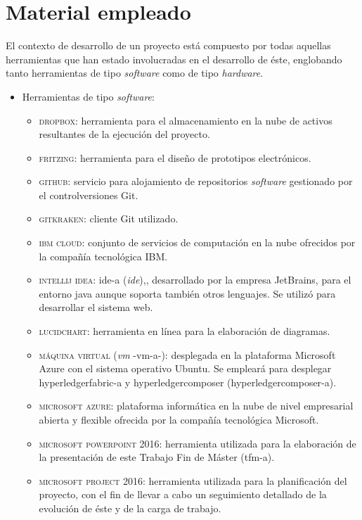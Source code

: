 \documentclass[12pt,a4paper, twoside]{report}
\begin{document}
	\section{Material empleado}\label{tools}
	
	El contexto de desarrollo de un proyecto está compuesto por todas aquellas herramientas que han estado involucradas en el desarrollo de éste, englobando tanto herramientas de tipo \textit{software} como de tipo \textit{hardware}. 

	\begin{itemize}
		\item Herramientas de tipo \textit{software}:
		\begin{itemize}
			\item \textsc{dropbox:} herramienta para el almacenamiento en la nube de activos resultantes de la ejecución del proyecto.
			\item \textsc{fritzing:} herramienta para el diseño de \glspl{prototipo} electrónicos.
			\item \textsc{github:} servicio para alojamiento de repositorios \textit{software} gestionado por el \gls{controlversiones} Git.
			\item \textsc{gitkraken:} cliente Git utilizado.
			\item \textsc{ibm cloud:} conjunto de servicios de computación en la nube ofrecidos por la compañía tecnológica IBM.
			\item \textsc{intellij idea:} \gls{ide-a} (\textit{\gls{ide}}),, desarrollado por la empresa JetBrains, para el entorno \gls{java} aunque soporta también otros lenguajes. Se utilizó para desarrollar el sistema web.
			\item \textsc{lucidchart:} herramienta en línea para la elaboración de diagramas.
			\item \textsc{máquina virtual} (\textit{\gls{vm}} -\gls{vm-a}-): desplegada en la plataforma Microsoft Azure con el sistema operativo Ubuntu. Se empleará para desplegar \gls{hyperledgerfabric-a} y \gls{hyperledgercomposer} (\gls{hyperledgercomposer-a}).
			\item \textsc{microsoft azure:} plataforma informática en la nube de nivel empresarial abierta y flexible ofrecida por la compañía tecnológica Microsoft.
			\item \textsc{microsoft powerpoint 2016:} herramienta utilizada para la elaboración de la presentación de este Trabajo Fin de Máster (\gls{tfm-a}).
			\item \textsc{microsoft project 2016:} herramienta utilizada para la planificación del proyecto, con el fin de llevar a cabo un seguimiento detallado de la evolución de éste y de la carga de trabajo.

\end{itemize}
\end{itemize}
\end{document}
